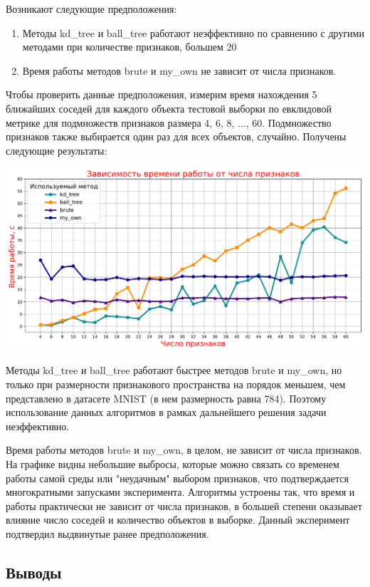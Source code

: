 \documentclass{article}
\begin{document}
Возникают следующие предположения:
\begin{enumerate}
    \item Методы kd\_tree и ball\_tree работают неэффективно по сравнению с другими методами при количестве признаков, большем 20
    \item Время работы методов brute и my\_own не зависит от числа признаков.
\end{enumerate}


Чтобы проверить данные предположения, измерим время нахождения 5 ближайших соседей для каждого объекта тестовой выборки по евклидовой метрике для подмножеств признаков размера 4, 6, 8, ..., 60. Подмножество признаков также выбирается один раз для всех объектов, случайно.
Получены следующие результаты:
\begin{center}
\includegraphics[width=15cm]{TASK1 PRAC FIGURE 0 time work.pdf}
\end{center}

Методы kd\_tree и ball\_tree работают быстрее методов brute и my\_own, но только при размерности признакового пространства на порядок меньшем, чем представлено в датасете MNIST (в нем размерность равна 784). Поэтому использование данных алгоритмов в рамках дальнейшего решения задачи неэффективно. 

Время работы методов brute и my\_own, в целом, не зависит от числа признаков. На графике видны небольшие выбросы, которые можно связать со временем работы самой среды или "неудачным"{ }выбором признаков, что подтверждается многократными запусками эксперимента. Алгоритмы устроены так, что время и работы практически не зависит от числа признаков, в большей степени оказывает влияние число соседей и количество объектов в выборке. Данный эксперимент подтвердил выдвинутые ранее предположения.

\subsection{Выводы}
\end{document}
